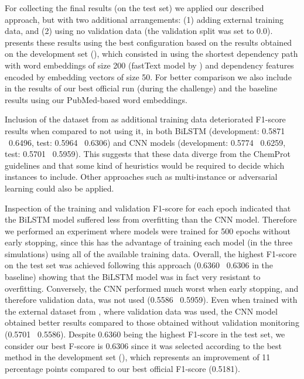 

For collecting the final results (on the test set) we applied our described approach, but with two additional arrangements: (1) adding  external training data, and (2) using no validation data (the validation split was set to 0.0).
 presents these results using the best configuration based on the results obtained on the development set (), which consisted in using the shortest dependency path with word embeddings of size 200 (fastText model by \textcite{chen2019g}) and dependency features encoded by embedding vectors of size 50.
For better comparison we also include in  the results of our best official run (during the challenge) and the baseline results using our PubMed-based word embeddings.

Inclusion of the dataset from  as additional training data deteriorated F1-score results when compared to not using it, in both BiLSTM (development: 0.5871 \versus\ 0.6496, test: 0.5964 \versus\ 0.6306) and CNN models (development: 0.5774 \versus\ 0.6259, test: 0.5701 \versus\ 0.5959).
This suggests that these data diverge from the ChemProt guidelines and that some kind of heuristics would be required to decide which instances to include.
Other approaches such as multi-instance \parencite{surdeanu2012a,lamurias2017a,eberts2021a} or adversarial learning \parencite{qin2018a} could also be applied.

Inspection of the training and validation F1-score for each epoch indicated that the BiLSTM model suffered less from overfitting than the CNN model.
Therefore we performed an experiment where models were trained for 500 epochs without early stopping, since this has the advantage of training each model (in the three simulations) using all of the available training data.
Overall, the highest F1-score on the test set was achieved following this approach (0.6360 \versus\ 0.6306 in the baseline) showing that the BiLSTM model was in fact very resistant to overfitting.
Conversely, the CNN performed much worst when early stopping, and therefore validation data, was not used (0.5586 \versus\ 0.5959).
Even when trained with the external dataset from , where validation data was used, the CNN model obtained better results compared to those obtained without validation monitoring (0.5701 \versus\ 0.5586).
Despite 0.6360 being the highest F1-score in the test set, we consider our best F-score is 0.6306 since it was selected according to the best method in the development set (), which represents an improvement of 11 percentage points compared to our best official F1-score (0.5181).


